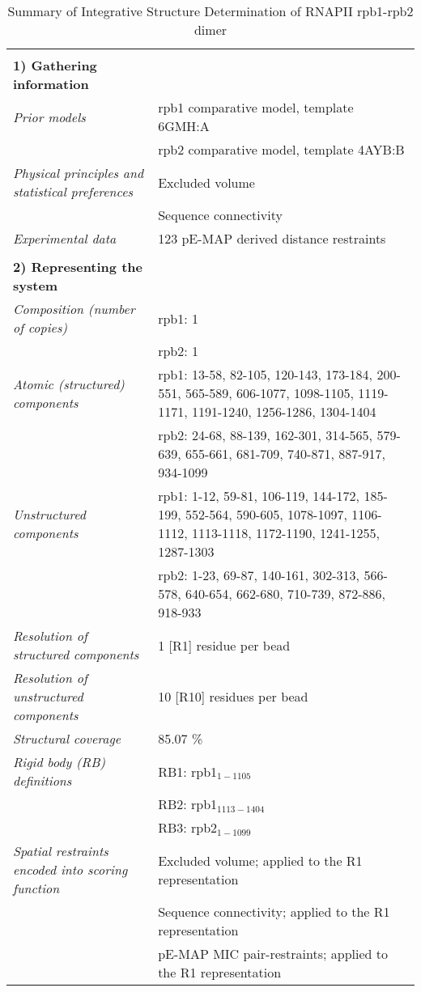 \documentclass[8pt,a4paper]{article}
\begin{document}
\setcounter{table}{1}

\begin{longtable}{ p{} | p{} } 
\caption{Summary of Integrative Structure Determination of RNAPII rpb1-rpb2 dimer}
  
  &  \\
  \textbf{1) Gathering information} & \\
    \hline

            \textit{Prior models} & rpb1 comparative model, template 6GMH:A\\
            & rpb2 comparative model, template 4AYB:B \\
                \textit{Physical principles and statistical preferences} & Excluded volume\\
            & Sequence connectivity \\
                \textit{Experimental data} & 123 pE-MAP derived distance restraints\\
          
    &  \\
    \normalsize{\textbf{2) Representing the system}} & \\
    \hline
    
            \textit{Composition (number of copies)} & rpb1: 1\\
            & rpb2: 1 \\
                \textit{Atomic (structured) components} & rpb1: 13-58, 82-105, 120-143, 173-184, 200-551, 565-589, 606-1077, 1098-1105, 1119-1171, 1191-1240, 1256-1286, 1304-1404\\
            & rpb2: 24-68, 88-139, 162-301, 314-565, 579-639, 655-661, 681-709, 740-871, 887-917, 934-1099 \\
                \textit{Unstructured components} & rpb1: 1-12, 59-81, 106-119, 144-172, 185-199, 552-564, 590-605, 1078-1097, 1106-1112, 1113-1118, 1172-1190, 1241-1255, 1287-1303\\
            & rpb2: 1-23, 69-87, 140-161, 302-313, 566-578, 640-654, 662-680, 710-739, 872-886, 918-933 \\
                \textit{Resolution of structured components} & 1 [R1] residue per bead\\
                \textit{Resolution of unstructured components} & 10 [R10] residues per bead\\
                \textit{Structural coverage} & 85.07 \%\\
                \textit{Rigid body (RB) definitions} & RB1: rpb1$_{1-1105}$\\
            & RB2: rpb1$_{1113-1404}$ \\
            & RB3: rpb2$_{1-1099}$ \\
                \textit{Spatial restraints encoded into scoring function} & Excluded volume; applied to the R1 representation\\
            & Sequence connectivity; applied to the R1 representation \\
            & pE-MAP MIC pair-restraints; applied to the R1 representation \\
          



\end{longtable}
\end{document}

